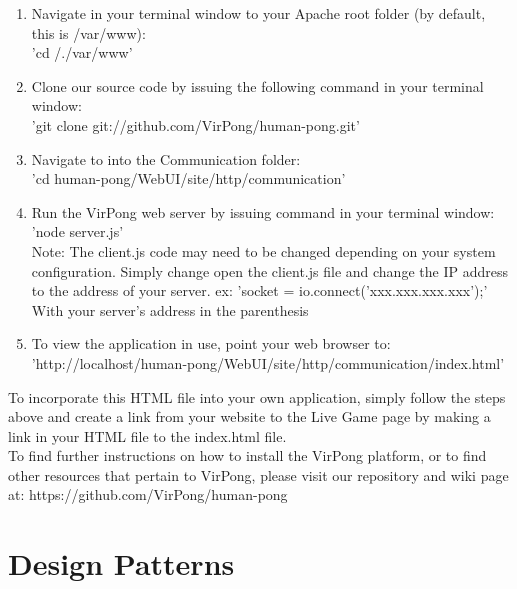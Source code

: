 		\begin{enumerate}
			\item Navigate in your terminal window to your Apache root folder (by default, this is /var/www):\\'cd /./var/www'
			\item Clone our source code by issuing the following command in your terminal window:\\'git clone git://github.com/VirPong/human-pong.git'
			\item Navigate to into the Communication folder:\\'cd human-pong/WebUI/site/http/communication'
			\item Run the VirPong web server by issuing command in your terminal window:\\'node server.js'\\Note: The client.js code may need to be changed depending on your system configuration. Simply change open the client.js file and change the IP address to the address of your server. ex: 'socket = io.connect('xxx.xxx.xxx.xxx');' With your server's address in the parenthesis
			\item To view the application in use, point your web browser to: 'http://localhost/human-pong/WebUI/site/http/communication/index.html'
		\end{enumerate}
		To incorporate this HTML file into your own application, simply follow the steps above and create a link from your website to the Live Game page by making a link in your HTML file to the index.html file.\\To find further instructions on how to install the VirPong platform, or to find other resources that pertain to VirPong, please visit our repository and wiki page at: https://github.com/VirPong/human-pong
		
	\section{Design Patterns}
